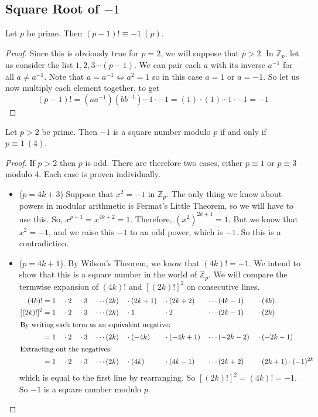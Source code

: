 \subsection{Square Root of $-1$}
\begin{theorem}
	Let $p$ be prime. Then $(p-1)! \equiv -1\ (p)$.
\end{theorem}
\begin{proof}
	Since this is obviously true for $p=2$, we will suppose that $p>2$. In $\mathbb Z_p$, let us consider the list $1, 2, 3 \cdots (p-1)$. We can pair each $a$ with its inverse $a^{-1}$ for all $a \neq a^{-1}$. Note that $a = a^{-1} \iff a^2 = 1$ so in this case $a=1$ or $a=-1$. So let us now multiply each element together, to get
	\[ (p-1)! = (aa^{-1}) (bb^{-1}) \cdots 1 \cdot -1 = (1) \cdot (1) \cdots 1 \cdot -1 = -1 \]
\end{proof}

\begin{proposition}
	Let $p>2$ be prime. Then $-1$ is a square number modulo $p$ if and only if $p \equiv 1\ (4)$.
\end{proposition}
\begin{proof}
	If $p>2$ then $p$ is odd. There are therefore two cases, either $p \equiv 1$ or $p \equiv 3$ modulo 4. Each case is proven individually.
	\begin{itemize}
		\item ($p = 4k + 3$) Suppose that $x^2 = -1$ in $\mathbb Z_p$. The only thing we know about powers in modular arithmetic is Fermat's Little Theorem, so we will have to use this. So, $x^{p-1} = x^{4k+2} = 1$. Therefore, $(x^2)^{2k+1} = 1$. But we know that $x^2=-1$, and we raise this $-1$ to an odd power, which is $-1$. So this is a contradiction.
		\item ($p = 4k + 1$). By Wilson's Theorem, we know that $(4k)! = -1$. We intend to show that this is a square number in the world of $\mathbb Z_p$. We will compare the termwise expansion of $(4k)!$ and $[(2k)!]^2$ on consecutive lines.
		      \begin{alignat*}{9}
			      (4k)!     & = 1 &  & \cdot 2 &  & \cdot 3 &  & \cdots (2k) &  & \cdot (2k+1) &  & \cdot (2k+2)  &  & \cdots (4k-1)  &  & \cdot (4k)                   \\
			      [(2k)!]^2 & = 1 &  & \cdot 2 &  & \cdot 3 &  & \cdots (2k) &  & \cdot 1      &  & \cdot 2       &  & \cdots (2k-1)  &  & \cdot (2k)                   \\
			      \intertext{By writing each term as an equivalent negative:}
			                & = 1 &  & \cdot 2 &  & \cdot 3 &  & \cdots (2k) &  & \cdot (-4k)  &  & \cdot (-4k+1) &  & \cdots (-2k-2) &  & \cdot (-2k-1)                \\
			      \intertext{Extracting out the negatives:}
			                & = 1 &  & \cdot 2 &  & \cdot 3 &  & \cdots (2k) &  & \cdot (4k)   &  & \cdot (4k-1)  &  & \cdots (2k+2)  &  & \cdot (2k+1) \cdot (-1)^{2k}
		      \end{alignat*}
		      which is equal to the first line by rearranging. So $[(2k)!]^2 = (4k)! = -1$. So $-1$ is a square number modulo $p$.
	\end{itemize}
\end{proof}

